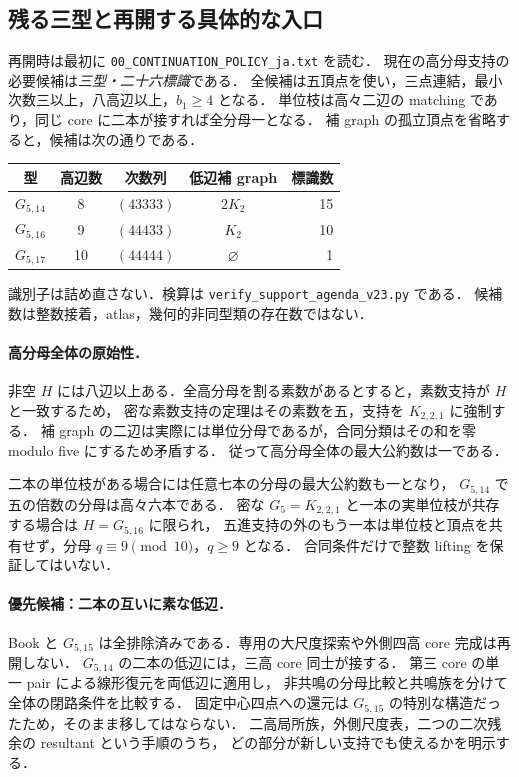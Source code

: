 \subsection{残る三型と再開する具体的な入口}
\label{ns23:support-agenda}\label{ns22:support-agenda}\label{ns20:support-agenda}

再開時は最初に \nolinkurl{00_CONTINUATION_POLICY_ja.txt} を読む．
現在の高分母支持の必要候補は\emph{三型・二十六標識}である．
全候補は五頂点を使い，三点連結，最小次数三以上，八高辺以上，$b_1\ge4$ となる．
単位枝は高々二辺の matching であり，同じ core に二本が接すれば全分母一となる．
補 graph の孤立頂点を省略すると，候補は次の通りである．
\begin{center}\small
\begin{tabular}{c|c|c|c|r}
型&高辺数&次数列&低辺補 graph&標識数\\\hline
$G_{5,14}$&8&$(43333)$&$2K_2$&15\\
$G_{5,16}$&9&$(44433)$&$K_2$&10\\
$G_{5,17}$&10&$(44444)$&$\varnothing$&1
\end{tabular}
\end{center}
識別子は詰め直さない．検算は \nolinkurl{verify_support_agenda_v23.py} である．
候補数は整数接着，atlas，幾何的非同型類の存在数ではない．

\paragraph{高分母全体の原始性．}
非空 $H$ には八辺以上ある．全高分母を割る素数があるとすると，素数支持が $H$ と一致するため，
密な素数支持の定理はその素数を五，支持を $K_{2,2,1}$ に強制する．
補 graph の二辺は実際には単位分母であるが，合同分類はその和を零 modulo five にするため矛盾する．
従って高分母全体の最大公約数は一である．

二本の単位枝がある場合には任意七本の分母の最大公約数も一となり，
$G_{5,14}$ で五の倍数の分母は高々六本である．
密な $G_5=K_{2,2,1}$ と一本の実単位枝が共存する場合は $H=G_{5,16}$ に限られ，
五進支持の外のもう一本は単位枝と頂点を共有せず，分母 $q\equiv9\pmod{10}$，$q\ge9$ となる．
合同条件だけで整数 lifting を保証してはいない．

\paragraph{優先候補：二本の互いに素な低辺．}
Book と $G_{5,15}$ は全排除済みである．専用の大尺度探索や外側四高 core 完成は再開しない．
$G_{5,14}$ の二本の低辺には，三高 core 同士が接する．
第三 core の単一 pair による線形復元を両低辺に適用し，
非共鳴の分母比較と共鳴族を分けて全体の閉路条件を比較する．
固定中心四点への還元は $G_{5,15}$ の特別な構造だったため，そのまま移してはならない．
二高局所族，外側尺度表，二つの二次残余の resultant という手順のうち，
どの部分が新しい支持でも使えるかを明示する．

